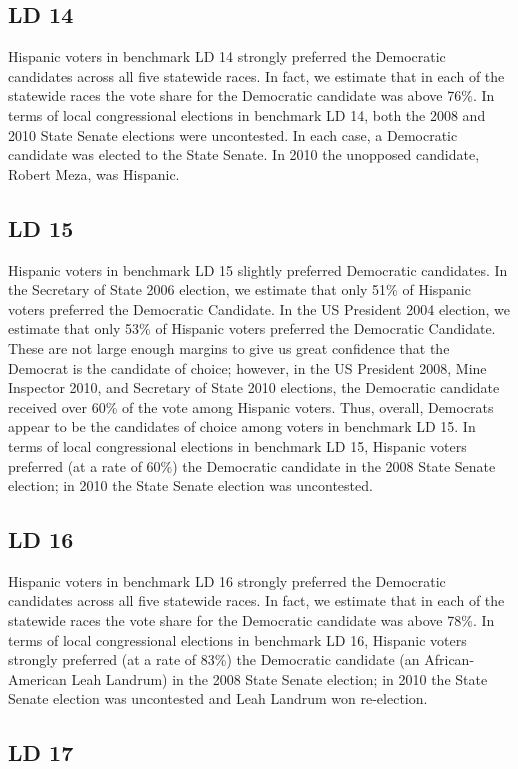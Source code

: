 \documentclass[12pt]{article}
\begin{document}
\subsection{LD 14}
Hispanic voters in benchmark LD 14 strongly preferred the Democratic candidates across all five statewide races. In fact, we estimate that in each of the statewide races the vote share for the Democratic candidate was above 76\%. In terms of local congressional elections in benchmark LD 14, both the 2008 and 2010 State Senate elections were uncontested. In each case, a Democratic candidate was elected to the State Senate. In 2010 the unopposed  candidate, Robert Meza, was Hispanic.

\subsection{LD 15}
Hispanic voters in benchmark LD 15 slightly preferred Democratic candidates. In the Secretary of State 2006 election, we estimate that only 51\% of Hispanic voters preferred the Democratic Candidate. In the US President 2004 election, we estimate that only 53\% of Hispanic voters preferred the Democratic Candidate. These are not large enough margins to give us great confidence that the Democrat is the candidate of choice; however, in the US President 2008, Mine Inspector 2010, and Secretary of State 2010 elections, the Democratic candidate received over 60\% of the vote among Hispanic voters. Thus, overall, Democrats appear to be the candidates of choice among voters in benchmark LD 15. In terms of local congressional elections in benchmark LD 15, Hispanic voters preferred (at a rate of 60\%) the Democratic candidate in the 2008 State Senate election; in 2010 the State Senate election was uncontested.

\subsection{LD 16}
Hispanic voters in benchmark LD 16 strongly preferred the Democratic candidates across all five statewide races. In fact, we estimate that in each of the statewide races the vote share for the Democratic candidate was above 78\%. In terms of local congressional elections in benchmark LD 16, Hispanic voters strongly preferred (at a rate of 83\%) the Democratic candidate (an African-American Leah Landrum) in the 2008 State Senate election; in 2010 the State Senate election was uncontested and Leah Landrum won re-election.

\subsection{LD 17}
\end{document}
